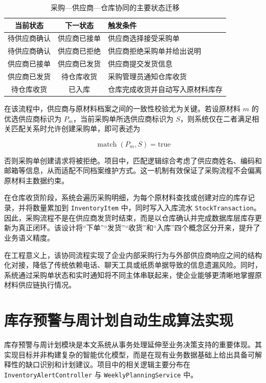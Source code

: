 \begin{table}[htbp]
\centering
\footnotesize
\caption{采购—供应商—仓库协同的主要状态迁移}
\label{tab:purchase-status-flow}
\begin{tabular}{|c|c|p{5.6cm}|}
\hline
当前状态 & 下一状态 & 触发条件 \\\hline
待供应商确认 & 供应商已接单 & 供应商选择接受采购单 \\\hline
待供应商确认 & 供应商已拒绝 & 供应商拒绝采购单并给出说明 \\\hline
供应商已接单 & 供应商已发货 & 供应商提交发货信息 \\\hline
供应商已发货 & 待仓库收货 & 采购管理员通知仓库收货 \\\hline
待仓库收货 & 已入库 & 仓库完成收货并自动写入原材料库存 \\\hline
\end{tabular}
\end{table}

在该流程中，供应商与原材料档案之间的一致性校验尤为关键。若设原材料 $m$ 的优选供应商标识为 $P_m$，当前采购单所选供应商标识为 $S$，则系统仅在二者满足相关匹配关系时允许创建采购单，即可表述为

\begin{equation}
\operatorname{match}(P_m, S) = \text{true}
\end{equation}

否则采购单创建请求将被拒绝。项目中，匹配逻辑综合考虑了供应商姓名、编码和邮箱等信息，从而适配不同档案维护方式。这一机制有效保证了采购流程不会偏离原材料主数据约束。

在仓库收货阶段，系统会遍历采购明细，为每个原材料查找或创建对应的库存记录，并将数量累加到 \texttt{InventoryItem} 中，同时写入入库流水 \texttt{StockTransaction}。因此，采购流程不是在供应商发货时结束，而是以仓库确认并完成数据库层库存更新为真正闭环。该设计将“下单”“发货”“收货”和“入库”四个概念区分开来，提升了业务语义精度。

在工程意义上，该协同流程实现了企业内部采购行为与外部供应商响应之间的结构化对接，降低了传统依赖电话、聊天工具或纸质单据导致的信息遗漏风险。同时，系统通过采购单状态和实时通知将不同主体串联起来，使企业能够更清晰地掌握原材料供应链执行情况。

\section{库存预警与周计划自动生成算法实现}

库存预警与周计划模块是本文系统从事务处理延伸至业务决策支持的重要体现。其实现目标并非构建复杂的智能优化模型，而是在现有业务数据基础上给出具备可解释性的缺口识别和计划建议。项目中的相关逻辑主要分布在 \texttt{InventoryAlertController} 与 \texttt{WeeklyPlanningService} 中。

